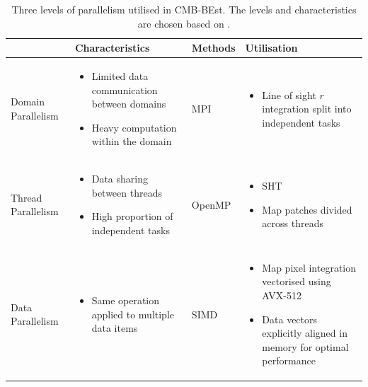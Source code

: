 \begin{table}[h]
	\caption{Three levels of parallelism utilised in CMB-BEst. The levels and characteristics are chosen based on \cite{Jeffers2016intel}.}
	\centering
	\label{table:three_levels_of_parallelism}
	\renewcommand{\arraystretch}{1.5} 
	\begin{tabular}{m{}   m{}   m{}   m{}} \toprule
		 & Characteristics & Methods & Utilisation \\
		
		\midrule
		Domain \newline Parallelism &
		\begin{itemize}[leftmargin=*]
			\item Limited data communication between domains
			\item Heavy computation within the domain
		\end{itemize} &
		MPI &
		\begin{itemize}[leftmargin=*]
			\item Line of sight $r$ integration split into independent tasks
		\end{itemize}  \\
	
		\midrule
		Thread \newline Parallelism &
		\begin{itemize}[leftmargin=*]
			\item Data sharing between threads
			\item High proportion of independent tasks
		\end{itemize} &
		OpenMP &
		\begin{itemize}[leftmargin=*]
			\item SHT
			\item Map patches divided across threads
		\end{itemize}  \\	
	
		\midrule
		Data \newline Parallelism &
		\begin{itemize}[leftmargin=*]
			\item Same operation applied to multiple data items
		\end{itemize} &
		SIMD &
		\begin{itemize}[leftmargin=*]
			\item Map pixel integration vectorised using AVX-512
			\item Data vectors explicitly aligned in memory for optimal performance 
		\end{itemize} \\	
			
		\bottomrule
	\end{tabular}
\end{table}


